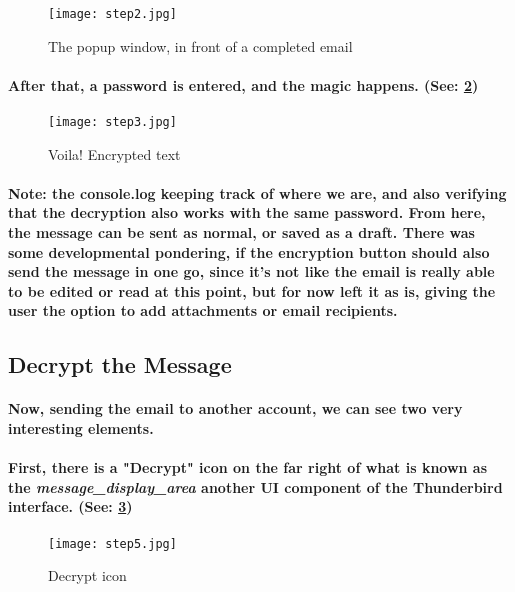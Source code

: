 \begin{figure}[H]
    \centering
    \texttt{[image: step2.jpg]}
    \caption{\label{fig: button} The popup window, in front of a completed email}
\end{figure}

\paragraph{After that, a password is entered, and the magic happens. (See: \ref{fig: encryptedText})}

\begin{figure}[H]
    \centering
    \texttt{[image: step3.jpg]}
    \caption{\label{fig: encryptedText} Voila! Encrypted text}
\end{figure}

\paragraph{Note: the console.log keeping track of where we are, and also verifying that the decryption also works with the same password. From here, the message can be sent as normal, or saved as a draft. There was some developmental pondering, if the encryption button should also send the message in one go, since it's not like the email is really able to be edited or read at this point, but for now left it as is, giving the user the option to add attachments or email recipients.}


\subsection{Decrypt the Message}
\paragraph{Now, sending the email to another account, we can see two very interesting elements.}

\paragraph{First, there is a "Decrypt" icon on the far right of what is known as the \emph{message\_display\_area} another UI component of the Thunderbird interface. (See: \ref{fig: decryptButton})}

\begin{figure}[H]
    \centering
    \texttt{[image: step5.jpg]}
    \caption{\label{fig: decryptButton} Decrypt icon}
\end{figure}



